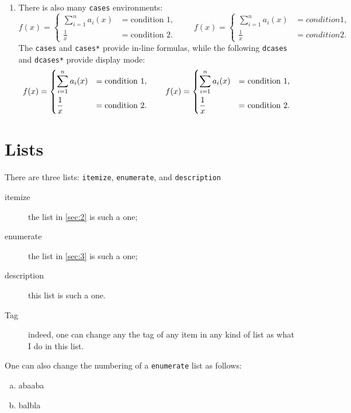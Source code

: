 \documentclass[11pt]{article}
\theoremstyle{plain}
\theoremstyle{definition}
\theoremstyle{remark}
\numberwithin{equation}{problem}
\begin{document}
\begin{enumerate}
\begin{align*}
		& \vdotswithin{=}\\
		& = \framebox[6cm][c]{last line}
	\end{align*}
	(see the code for more details such as the use of \verb|\vdotswithin{=}|)
	\item There is also many \verb|cases| environments:
	\[
		f(x) =
		\begin{cases}
			\sum_{i=1}^{n}a_i(x) &= \text{condition 1}, \\
			\frac{1}{x} &= \text{condition 2}.
		\end{cases}\qquad
		f(x) =
		\begin{cases*}
			\sum_{i=1}^{n}a_i(x) &= condition 1, \\
			\frac{1}{x} &= condition 2.
		\end{cases*}
	\]
	The \verb|cases| and \verb|cases*| provide in-line formulas, while the following \verb|dcases| and \verb|dcases*| provide display mode:
	\[
		f(x) =
		\begin{dcases}
			\sum_{i=1}^{n}a_i(x) &= \text{condition 1}, \\
			\frac{1}{x} &= \text{condition 2}.
		\end{dcases}\qquad
		f(x) =
		\begin{dcases*}
			\sum_{i=1}^{n}a_i(x) &= condition 1, \\
			\frac{1}{x} &= condition 2.
		\end{dcases*}
	\]
\end{enumerate}

\section{Lists}
There are three lists: \verb|itemize|, \verb|enumerate|, and \verb|description|
\begin{description}
	\item[itemize] the list in \cref{sec:2} is such a one;
	\item[enumerate] the list in \cref{sec:3} is such a one;
	\item[description] this list is such a one.
	\item[Tag] indeed, one can change any the tag of any item in any kind of list as what I do in this list.
\end{description}
One can also change the numbering of a \verb|enumerate| list as follows:
\begin{enumerate}[(a).]
	\item abaaba
	\item balbla
\end{enumerate}
\end{document}
